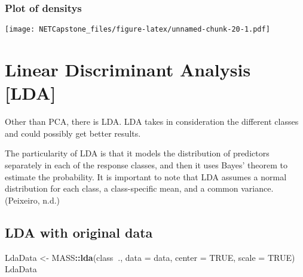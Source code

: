 \documentclass[
]{article}
\newenvironment{Shaded}{\begin{snugshade}}{\end{snugshade}}
\newcommand{\DataTypeTok}[1]{\textcolor[rgb]{0.13,0.29,0.53}{#1}}
\newcommand{\DecValTok}[1]{\textcolor[rgb]{0.00,0.00,0.81}{#1}}
\newcommand{\FloatTok}[1]{\textcolor[rgb]{0.00,0.00,0.81}{#1}}
\newcommand{\KeywordTok}[1]{\textcolor[rgb]{0.13,0.29,0.53}{\textbf{#1}}}
\newcommand{\NormalTok}[1]{#1}
\newcommand{\OperatorTok}[1]{\textcolor[rgb]{0.81,0.36,0.00}{\textbf{#1}}}
\newcommand{\OtherTok}[1]{\textcolor[rgb]{0.56,0.35,0.01}{#1}}
\newcommand{\StringTok}[1]{\textcolor[rgb]{0.31,0.60,0.02}{#1}}
\begin{document}
\hypertarget{plot-of-densitys-1}{%
\subsubsection{Plot of densitys}\label{plot-of-densitys-1}}

\begin{Shaded}
\end{Shaded}

\texttt{[image: NETCapstone\_files/figure-latex/unnamed-chunk-20-1.pdf]}

\hypertarget{linear-discriminant-analysis-lda}{%
\section{Linear Discriminant Analysis
{[}LDA{]}}\label{linear-discriminant-analysis-lda}}

Other than PCA, there is LDA. LDA takes in consideration the different
classes and could possibly get better results.

The particularity of LDA is that it models the distribution of
predictors separately in each of the response classes, and then it uses
Bayes' theorem to estimate the probability. It is important to note that
LDA assumes a normal distribution for each class, a class-specific mean,
and a common variance. (Peixeiro, n.d.)

\hypertarget{lda-with-original-data}{%
\subsection{LDA with original data}\label{lda-with-original-data}}

\begin{Shaded}
\begin{Highlighting}[]
\NormalTok{LdaData <-}\StringTok{ }\NormalTok{MASS}\OperatorTok{::}\KeywordTok{lda}\NormalTok{(class}\OperatorTok{~}\NormalTok{., }\DataTypeTok{data =}\NormalTok{ data, }\DataTypeTok{center =} \OtherTok{TRUE}\NormalTok{, }\DataTypeTok{scale =} \OtherTok{TRUE}\NormalTok{) }
\NormalTok{LdaData}
\end{Highlighting}
\end{Shaded}
\end{document}
